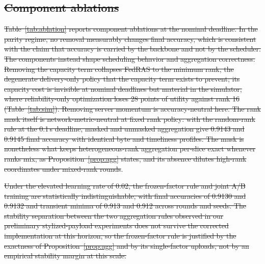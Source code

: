 \documentclass[preprint,12pt]{elsarticle}
\providecommand{\DIFadd}[1]{{\protect\color{blue}\uwave{#1}}} %
\providecommand{\DIFdel}[1]{{\protect\color{red}\sout{#1}}}                      %
\providecommand{\DIFaddbegin}{} %
\providecommand{\DIFaddend}{} %
\providecommand{\DIFdelbegin}{} %
\providecommand{\DIFdelend}{} %
\newcommand{\DIFscaledelfig}{0.5}
\newlength{\DIFdelgraphicswidth} %
\newlength{\DIFdelgraphicsheight} %
\newcommand{\DIFaddincludegraphics}[2][]{{\color{blue}\fbox{\DIFOincludegraphics[#1]{#2}}}} %
\newcommand{\DIFdelincludegraphics}[2][]{%
\sbox{\DIFdelgraphicsbox}{\DIFOincludegraphics[#1]{#2}}%
\settoboxwidth{\DIFdelgraphicswidth}{\DIFdelgraphicsbox} %
\settoboxtotalheight{\DIFdelgraphicsheight}{\DIFdelgraphicsbox} %
\scalebox{\DIFscaledelfig}{%
\parbox[b]{\DIFdelgraphicswidth}{\usebox{\DIFdelgraphicsbox}\\[-\baselineskip] \rule{\DIFdelgraphicswidth}{0em}}\llap{\resizebox{\DIFdelgraphicswidth}{\DIFdelgraphicsheight}{%
\setlength{\unitlength}{\DIFdelgraphicswidth}%
\begin{picture}(1,1)%
\thicklines\linethickness{2pt} %
{\color[rgb]{1,0,0}\put(0,0){\framebox(1,1){}}}%
{\color[rgb]{1,0,0}\put(0,0){\line( 1,1){1}}}%
{\color[rgb]{1,0,0}\put(0,1){\line(1,-1){1}}}%
\end{picture}%
}\hspace*{3pt}}} %
} %
\DeclareRobustCommand{\DIFaddbegin}{\DIFOaddbegin \let\includegraphics\DIFaddincludegraphics} %
\DeclareRobustCommand{\DIFaddend}{\DIFOaddend \let\includegraphics\DIFOincludegraphics} %
\DeclareRobustCommand{\DIFdelbegin}{\DIFOdelbegin \let\includegraphics\DIFdelincludegraphics} %
\DeclareRobustCommand{\DIFdelend}{\DIFOaddend \let\includegraphics\DIFOincludegraphics} %
\begin{document}
\subsection{\DIFdel{Component ablations}}
\addtocounter{subsection}{-1}%
\DIFdel{Table~\ref{tab:ablation} reports component ablations at the nominal deadline. In the parity regime, no removal measurably changes final accuracy, which is consistent with the claim that accuracy is carried by the backbone and not by the scheduler. The components instead shape scheduling behavior and aggregation correctness. Removing the capacity term collapses FedRAS to the minimum rank, the degenerate delivery-only policy that the capacity term exists to prevent; its capacity cost is invisible at nominal deadlines but material in the simulator, where reliability-only optimization loses 28 points of utility against rank 16 (Table~\ref{tab:sim}). Removing server momentum is accuracy-neutral here. The rank mask itself is network-metric-neutral at fixed rank policy: with the random-rank rule at the 0.1\,s deadline, masked and unmasked aggregation give 0.9143 and 0.9145 final accuracy with identical byte and timeliness profiles. The mask is nonetheless what keeps heterogeneous-rank aggregation per-slice exact whenever ranks mix, as Proposition~\ref{prop:agg} states, and its absence dilutes high-rank coordinates under mixed-rank rounds}\DIFdelend \DIFaddbegin \DIFadd{predictor would be recalibrated}\DIFaddend .

\DIFdelbegin \DIFdel{Under the elevated learning rate of 0.02, the frozen-factor rule and joint A/B training are statistically indistinguishable, with final accuracies of 0.9130 and 0.9132 and transient minima of 0.913 and 0.912 across rounds and seeds. The stability separation between the two aggregation rules observed in our preliminary stylized-payload experiments does not survive the corrected implementation at this horizon, so the frozen-factor rule is justified by the exactness of Proposition~\ref{prop:agg} and by its single-factor uploads, not by an empirical stability margin at this scale.
}%
\end{document}
